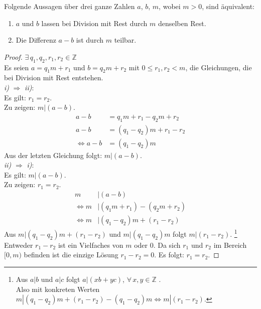 \begin{lemma}
  Folgende Aussagen über drei ganze Zahlen $a$, $b$, $m$, wobei $m > 0$, sind äquivalent:
  \begin{enumerate}[label=\roman*)]
    \item $a$ und $b$ lassen bei Division mit Rest durch $m$ denselben Rest.
    \item Die Differenz $a - b$ ist durch $m$ teilbar.
  \end{enumerate}
\end{lemma}
\begin{proof}
  $\exists \, q_1,q_2,r_1,r_2 \in \mathbb{Z}$ \\
  Es seien $a = q_1m + r_1$ und $b = q_2m + r_2$ mit $0 \leq r_1,r_2 < m$,
  die Gleichungen, die bei Division mit Rest entstehen. \\
  \textit{i)} $\Rightarrow$ \textit{ii)}: \\
  Es gilt: $r_1 = r_2$. \\
  Zu zeigen: $m|(a-b)$.
  \begin{align*}
    a - b                 & = q_1m + r_1 - q_2m + r_2  \\
    a - b                 & = (q_1 - q_2)m + r_1 - r_2 \\
    \Leftrightarrow a - b & = (q_1 - q_2)m
  \end{align*}
  Aus der letzten Gleichung folgt: $m | (a - b)$. \\
  \textit{ii)} $\Rightarrow$ \textit{i)}: \\
  Es gilt: $m | (a - b)$. \\
  Zu zeigen: $r_1 = r_2$.
  \begin{align*}
    m                 & | (a - b)                     \\
    \Leftrightarrow m & | (q_1m + r_1) - (q_2m + r_2) \\
    \Leftrightarrow m & | (q_1 - q_2)m + (r_1 - r_2)
  \end{align*}
  Aus $m|(q_1 - q_2)m + (r_1 - r_2)$ und $m|(q_1 - q_2)m$ folgt $m|(r_1 - r_2)$.
  \footnote{Aus $a|b$ und $a|c$ folgt $a|(xb + yc)$,
    $\forall \, x,y \in \mathbb{Z}$ \parencite[23]{BOOK:numberTheory}. \\
    Also mit konkreten Werten $m|(q_1 - q_2)m + (r_1 - r_2) - (q_1 - q_2)m \Leftrightarrow m|(r_1 - r_2)$.} \\
  Entweder $r_1 - r_2$ ist ein Vielfaches von $m$ oder 0.
  Da sich $r_1$ und $r_2$ im Bereich
  $[0,m)$ befinden ist die einzige Lösung $r_1 - r_2 = 0$. Es folgt: $r_1 = r_2$.
\end{proof}


